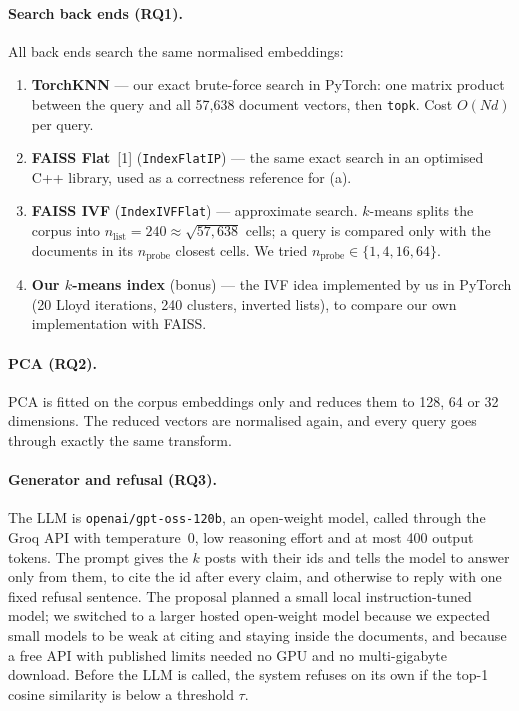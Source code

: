 \documentclass[11pt]{article}
\begin{document}
\paragraph{Search back ends (RQ1).} All back ends search the same normalised embeddings:
\begin{enumerate}[label=(\alph*), leftmargin=*]
\item \textbf{TorchKNN} --- our exact brute-force search in PyTorch: one matrix product between the query and
all 57,638 document vectors, then \texttt{topk}. Cost $O(N d)$ per query.
\item \textbf{FAISS Flat}~[1] (\texttt{IndexFlatIP}) --- the same exact search in an optimised C++ library, used
as a correctness reference for (a).
\item \textbf{FAISS IVF} (\texttt{IndexIVFFlat}) --- approximate search. $k$-means splits the corpus into
$n_{\text{list}} = 240 \approx \sqrt{57{,}638}$ cells; a query is compared only with the documents in its
$n_{\text{probe}}$ closest cells. We tried $n_{\text{probe}} \in \{1, 4, 16, 64\}$.
\item \textbf{Our $k$-means index} (bonus) --- the IVF idea implemented by us in PyTorch (20 Lloyd iterations,
240 clusters, inverted lists), to compare our own implementation with FAISS.
\end{enumerate}

\paragraph{PCA (RQ2).} PCA is fitted on the corpus embeddings only and reduces them to 128, 64 or 32 dimensions.
The reduced vectors are normalised again, and every query goes through exactly the same transform.

\paragraph{Generator and refusal (RQ3).} The LLM is \texttt{openai/gpt-oss-120b}, an open-weight model, called
through the Groq API with temperature~0, low reasoning effort and at most 400 output tokens. The prompt gives the
$k$ posts with their ids and tells the model to answer only from them, to cite the id after every claim, and
otherwise to reply with one fixed refusal sentence. The proposal planned a small local instruction-tuned model; we
switched to a larger hosted open-weight model because we expected small models to be weak at citing and staying
inside the documents, and because a free API with published limits needed no GPU and no multi-gigabyte download. Before
the LLM is called, the system refuses on its own if the top-1 cosine similarity is below a threshold $\tau$.
\end{document}
